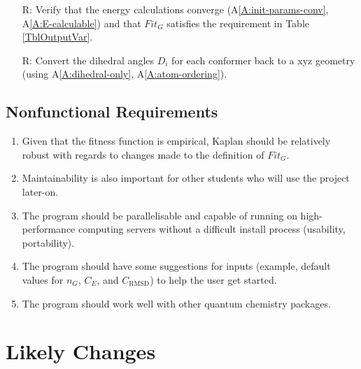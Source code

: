 \documentclass[12pt]{article}
\newcommand{\aref}[1]{A\ref{#1}}
\newcounter{reqnum} %
\newcommand{\progname}{Kaplan} %
\begin{document}
\begin{itemize}
\item[R\refstepcounter{reqnum}\thereqnum \label{R_VerifyOutput}:] Verify that 
the energy calculations converge (\aref{A:init-params-conv}, 
\aref{A:E-calculable}) and that $Fit_G$ satisfies 
the requirement in 
Table \ref{TblOutputVar}.

\item[R\refstepcounter{reqnum}\thereqnum \label{R_Output}:] Convert the 
dihedral angles $D_i$ for each conformer back to a xyz geometry (using 
\aref{A:dihedral-only}, \aref{A:atom-ordering}). 

\end{itemize}

\subsection{Nonfunctional Requirements}


\begin{enumerate}
	\item Given that the fitness function is 
	empirical, \progname{} should be relatively 
robust with regards to changes made to the definition 
of $Fit_G$.

\item Maintainability is also important for other 
students who will use the project 
later-on. 

\item The program should be parallelisable and capable 
of running on 
high-performance computing servers without a difficult install process 
(usability, portability). 

\item The program should have some suggestions for 
inputs (example, default values for $n_G$, $C_E$, and 
$C_\text{RMSD}$) to help the user get started. 

\item The program should work well with other quantum 
chemistry packages.

\end{enumerate}

\section{Likely Changes}    
\end{document}
